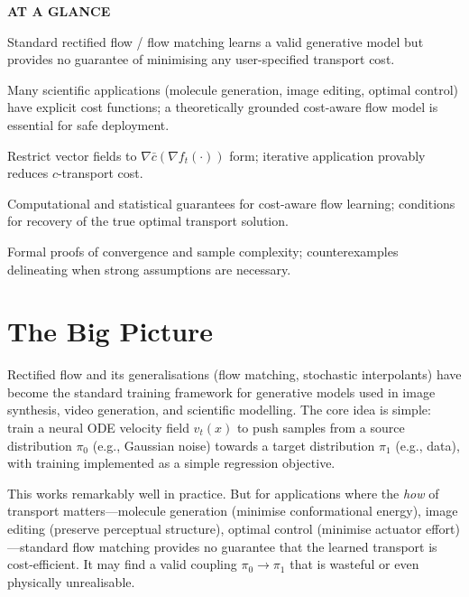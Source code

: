 \documentclass[10pt,twocolumn]{article}
\begin{document}
\begin{mdframed}[backgroundcolor=boxgray,linecolor=rulered,linewidth=1pt,
    innerleftmargin=6pt,innerrightmargin=6pt,
    innertopmargin=6pt,innerbottommargin=6pt]
\textbf{\small AT A GLANCE}\par\vspace{4pt}
\begin{description}[leftmargin=0pt,labelsep=4pt,itemsep=2pt,parsep=0pt,
    font=\small\bfseries]
  \item[Problem:] Standard rectified flow / flow matching learns a valid generative
    model but provides no guarantee of minimising any user-specified transport cost.
  \item[Why it matters:] Many scientific applications (molecule generation,
    image editing, optimal control) have explicit cost functions; a theoretically
    grounded cost-aware flow model is essential for safe deployment.
  \item[Method:] Restrict vector fields to $\nabla\bar{c}(\nabla f_t(\cdot))$ form;
    iterative application provably reduces $c$-transport cost.
  \item[Result:] Computational and statistical guarantees for cost-aware flow learning;
    conditions for recovery of the true optimal transport solution.
  \item[Evidence:] Formal proofs of convergence and sample complexity; counterexamples
    delineating when strong assumptions are necessary.
\end{description}
\end{mdframed}

\section{The Big Picture}

Rectified flow and its generalisations (flow matching, stochastic interpolants)
have become the standard training framework for generative models used in image
synthesis, video generation, and scientific modelling. The core idea is simple:
train a neural ODE velocity field $v_t(x)$ to push samples from a source distribution
$\pi_0$ (e.g., Gaussian noise) towards a target distribution $\pi_1$ (e.g., data),
with training implemented as a simple regression objective.

This works remarkably well in practice. But for applications where the \emph{how}
of transport matters---molecule generation (minimise conformational energy),
image editing (preserve perceptual structure), optimal control (minimise actuator
effort)---standard flow matching provides no guarantee that the learned transport
is cost-efficient. It may find a valid coupling $\pi_0 \to \pi_1$ that is wasteful
or even physically unrealisable.
\end{document}
